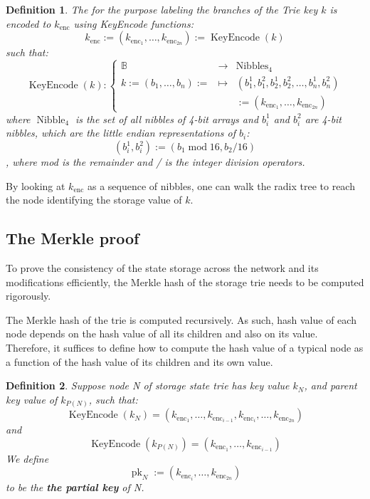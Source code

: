\documentclass{article}
\newcommand{\assign}{:=}
\newcommand{\nosymbol}{}
\newcommand{\tmop}[1]{\ensuremath{\operatorname{#1}}}
\newcommand{\tmstrong}[1]{\textbf{#1}}
\newcommand{\tmtextbf}[1]{{\bfseries{#1}}}
\newtheorem{definition}{Definition}
\providecommand{\nosymbol}{}
\providecommand{\tmop}[1]{\ensuremath{\mathrm{#1}}}
\providecommand{\tmstrong}[1]{\tmtextbf{#1}}
\providecommand{\tmtextbf}[1]{\tmtextbf{#1}}
\newtheorem{definition}{Definition}
\begin{document}
\begin{definition}
  The for the purpose labeling the branches of the Trie key $k$ is encoded to
  $k_{\tmop{enc}}$ using KeyEncode functions:
  \begin{equation}
    k_{\tmop{enc}} \assign (k_{\tmop{enc}_1}, \ldots, k_{\tmop{enc}_{2 n}})
    \assign \tmop{KeyEncode} (k) \label{key-encode-in-trie}
  \end{equation}
  such that:
  \[ \tmop{KeyEncode} (k) : \left\{ \begin{array}{lll}
       \mathbb{B}^{\nosymbol} & \rightarrow & \tmop{Nibbles}_4\\
       k \assign (b_1, \ldots, b_n) \assign & \mapsto & (b^1_1, b^2_1, b_2^1,
       b^2_2, \ldots, b^1_n, b^2_n)\\
       &  & \assign (k_{\tmop{enc}_1}, \ldots, k_{\tmop{enc}_{2 n}})
     \end{array} \right. \]
  where $\tmop{Nibble}_4$ is the set of all nibbles of 4-bit arrays and
  $b^1_i$ and $b^2_i$ are 4-bit nibbles, which are the little endian
  representations of $b_i$:
  \[ (b^1_i, b^2_i) \assign (b_1 \tmop{mod} 16, b_2 / 16) \]
  , where mod is the remainder and / is the integer division operators.
\end{definition}

By looking at $k_{\tmop{enc}}$ as a sequence of nibbles, one can walk the
radix tree to reach the node identifying the storage value of $k$.

\subsection{The Merkle proof}\label{sect-merkl-proof}

To prove the consistency of the state storage across the network and its
modifications efficiently, the Merkle hash of the storage trie needs to be
computed rigorously.

The Merkle hash of the trie is computed recursively. As such, hash value of
each node depends on the hash value of all its children and also on its value.
Therefore, it suffices to define how to compute the hash value of a typical
node as a function of the hash value of its children and its own value.

\begin{definition}
  Suppose node N of storage state trie has key value $k_N$, and parent key
  value of $k_{P (N)}$, such that:
  \[ \tmop{KeyEncode} (k_N) = (k_{\tmop{enc}_1}, \ldots, k_{\tmop{enc}_{i -
     1}}, k_{\tmop{enc}_i}, \ldots, k_{\tmop{enc}_{2 n}}) \]
  and
  \[ \tmop{KeyEncode} (k_{P (N)}) = (k_{\tmop{enc}_1}, \ldots,
     k_{\tmop{enc}_{i - 1}}) \]
  We define
  \[ \tmop{pk}_N \assign (k_{\tmop{enc}_i}, \ldots, k_{\tmop{enc}_{2 n}}) \]
  to be the {\tmstrong{the partial key}} of N.
\end{definition}
\end{document}
